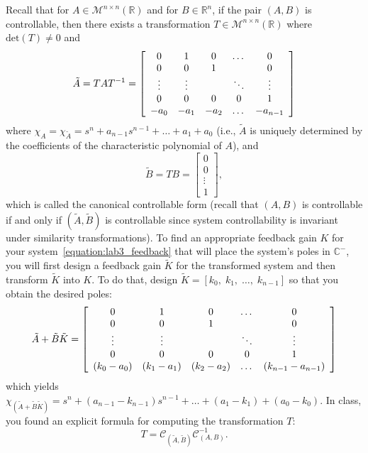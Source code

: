 \documentclass[12pt]{report}
\begin{document}
Recall that for $A \in \mathcal{M}^{n \times n}(\mathbb{R})$ and for $B \in \mathbb{R}^n$, if the pair $(A,B)$ is controllable, then there exists a transformation $T \in \mathcal{M}^{n \times n}(\mathbb{R})$ where $\text{det}(T) \not = 0$ and
\[
    \tilde{A} = TAT^{-1} =
    \left[\begin{array}{c c c c c}
            0      & 1      & 0    & \dots  & 0        \\
            0      & 0      & 1    &        & 0        \\
            \vdots & \vdots &      & \ddots & \vdots   \\
            0      & 0      & 0    & 0      & 1        \\
            -a_0   & -a_1   & -a_2 & \dots  & -a_{n-1}
        \end{array}\right]
\]
where $\chi_{A} = \chi_{\tilde{A}} = s^n + a_{n-1} s^{n-1} + \dots + a_1 + a_0$ (i.e., $\tilde{A}$ is uniquely determined by the coefficients of the characteristic polynomial of $A$), and
\[
    \tilde{B} = TB =
    \left[\begin{array}{c}
            0      \\
            0      \\
            \vdots \\
            1
        \end{array}\right],
\]
which is called the canonical controllable form (recall that $(A,B)$ is controllable if and only if $(\tilde{A},\tilde{B})$ is controllable since system controllability is invariant under similarity transformations). To find an appropriate feedback gain $K$ for your system~\eqref{equation:lab3_feedback} that will place the system's poles in $\mathbb{C}^-$, you will first design a feedback gain $\tilde{K}$ for the transformed system and then transform $\tilde{K}$ into $K$. To do that, design $\tilde{K} = [k_0, \; k_1, \; \dots, \; k_{n-1}]$ so that you obtain the desired poles:
\[
    \tilde{A}+\tilde{B}\tilde{K} =
    \left[\begin{array}{c c c c  c}
            0         & 1         & 0         & \dots  & 0                 \\
            0         & 0         & 1         &        & 0                 \\
            \vdots    & \vdots    &           & \ddots & \vdots            \\
            0         & 0         & 0         & 0      & 1                 \\
            (k_0-a_0) & (k_1-a_1) & (k_2-a_2) & \dots  & (k_{n-1}-a_{n-1})
        \end{array}\right]
\]
which yields $\chi_{(\tilde{A}+\tilde{B}\tilde{K})} = s^n + (a_{n-1}-k_{n-1})s^{n-1} + \dots + (a_1 - k_1) + (a_0 - k_0)$. In class, you found an explicit formula for computing the transformation $T$:
\[
    T=\mathcal{C}_{(\tilde{A},\tilde{B})} \mathcal{C}_{(A,B)}^{-1}.
\]
\end{document}
